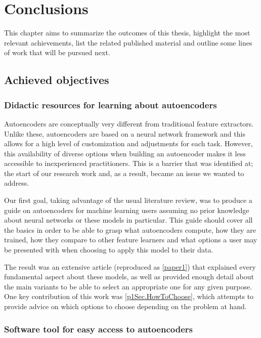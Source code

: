 \setchapterpreamble[u]{\margintoc}
\chapter{Conclusions}
\label{ch:conclusions}

This chapter aims to summarize the outcomes of this thesis, highlight the most relevant achievements, list the related published material and outline some lines of work that will be pursued next.

\section{Achieved objectives}

\subsection{Didactic resources for learning about autoencoders}

Autoencoders are conceptually very different from traditional feature extractors. Unlike these, autoencoders are based on a neural network framework and this allows for a high level of customization and adjustments for each task. However, this availability of diverse options when building an autoencoder makes it less accessible to inexperienced practitioners. This is a barrier that was identified at; the start of our research work and, as a result, became an issue we wanted to address.

Our first goal, taking advantage of the usual literature review, was to produce a guide on autoencoders for machine learning users assuming no prior knowledge about neural networks or these models in particular. This guide should cover all the basics in order to be able to grasp what autoencoders compute, how they are trained, how they compare to other feature learners and what options a user may be presented with when choosing to apply this model to their data.

The result was an extensive article (reproduced as \autoref{paper1}) that explained every fundamental aspect about these models, as well as provided enough detail about the main variants to be able to select an appropriate one for any given purpose. One key contribution of this work was \autoref{p1Sec.HowToChoose}, which attempts to provide advice on which options to choose depending on the problem at hand.

\subsection{Software tool for easy access to autoencoders}

